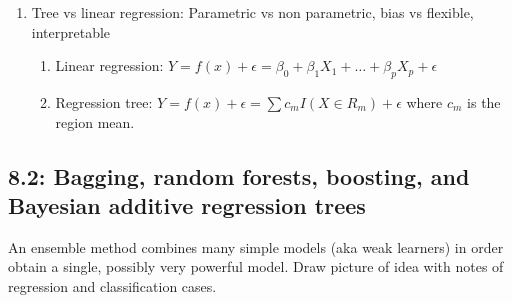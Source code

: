 \documentclass{article}
\begin{document}
\begin{enumerate}
\begin{enumerate}
\item Impurity measures: Choose the best split by weighted measures. Denote $\hat{p}_{mk}$ as the proportion of training observations in node $m$ belonging to class $k$. The purity of node $m$ is either:
\begin{itemize}
\item Classification error: $1-\max_k \hat{p}_{mk}$
\item Gini index: Low is more pure
\[
G_m = \sum_k \hat{p}_{mk}(1-\hat{p}_{mk}) = 1-\sum_k \hat{p}_{mk}^2
\]
This measures the total variance across the $K$ classes. Small if $\hat{p}_{mk}$ is close to zero or 1. Measures how often you'd misclassify a random observation in that node if you randomly labeled it according to the node's class proportions. 50/50 and 90/10 examples.
\item Cross-entropy (deviance): 
\[
-\sum_k \hat{p}_{mk} \log(\hat{p}_{mk})
\]
Comes from information theory and penalizes uncertainty more heavily than Gini. Note because $\hat{p}_{mk} \geq 0$, then $-\hat{p}_{mk}\log(\hat{p}_{mk}) \geq 0$. Like Gini, entropy is near zero if all $\hat{p}_{mk}$ are near 0 or 1.
\end{itemize}
\end{enumerate}

\item Tree vs linear regression: Parametric vs non parametric, bias vs flexible, interpretable
\begin{enumerate}
\item Linear regression: $Y = f(x) + \epsilon = \beta_0 + \beta_1 X_1 + \dots + \beta_p X_p + \epsilon$
\item Regression tree: $Y = f(x) + \epsilon = \sum c_m I(X \in R_m) + \epsilon$ where $c_m$ is the region mean.
\end{enumerate}
\end{enumerate}

\subsection*{8.2: Bagging, random forests, boosting, and Bayesian additive regression trees}

An ensemble method combines many simple models (aka weak learners) in order obtain a single, possibly very powerful model. Draw picture of idea with notes of regression and classification cases.
\end{document}

